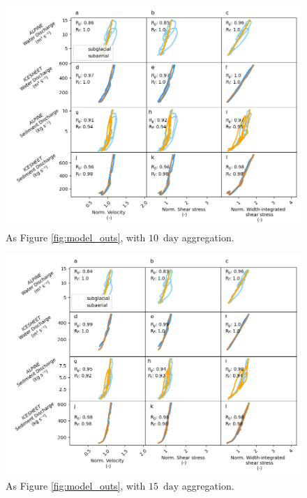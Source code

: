 \documentclass[draft]{agujournal2019}
\newcommand{\unit}[1]{$\mathrm{#1}$}
\begin{document}
\begin{center}
  \begin{figure}[!h]
    \includegraphics[width=0.7\linewidth]{Fig3_10day.png}
    \caption{As Figure \ref{fig:model_outs}, with $10$ \,\unit{day} aggregation.}
    \label{fig:model_outs_10day}
  \end{figure}
\end{center}

\begin{center}
  \begin{figure}[!h]
    \includegraphics[width=0.7\linewidth]{Fig3_15day.png}
    \caption{As Figure \ref{fig:model_outs}, with $15$ \,\unit{day} aggregation.}
    \label{fig:model_outs_15day}
  \end{figure}
\end{center}
\FloatBarrier



\newpage
\end{document}

